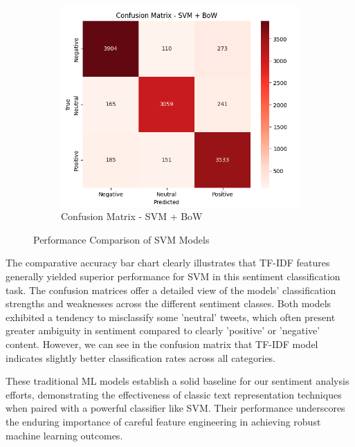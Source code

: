 \begin{figure}[h!]
\begin{subfigure}[t]{0.30\textwidth}
\end{subfigure}
\hfill
\begin{subfigure}[t]{0.30\textwidth}
\centering
\includegraphics[width=\textwidth]{./images/cm-svm-bow.png}
\caption{Confusion Matrix - SVM + BoW}
\label{fig:cm_bow}
\end{subfigure}
\caption{Performance Comparison of SVM Models}
\label{fig:svm_comparison}
\end{figure}

The comparative accuracy bar chart clearly illustrates that TF-IDF features generally yielded superior performance for SVM in this sentiment classification task. The confusion matrices offer a detailed view of the models' classification strengths and weaknesses across the different sentiment classes. Both models exhibited a tendency to misclassify some 'neutral' tweets, which often present greater ambiguity in sentiment compared to clearly 'positive' or 'negative' content. However, we can see in the confusion matrix that TF-IDF model indicates slightly better classification rates across all categories.

These traditional ML models establish a solid baseline for our sentiment analysis efforts, demonstrating the effectiveness of classic text representation techniques when paired with a powerful classifier like SVM. Their performance underscores the enduring importance of careful feature engineering in achieving robust machine learning outcomes.




